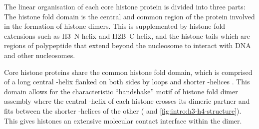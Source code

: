       The linear organisation of each core histone protein is divided
      into three parts: The histone fold domain is the central and
      common region of the protein
      involved in the formation of histone dimers.
      This is supplemented by histone fold extensions such as
      H3~\textalpha{}N helix and H2B~\textalpha{}C helix,
      and the histone tails which are regions of polypeptide
      that extend beyond the nucleosome to interact with DNA and
      other nucleosomes.

      Core histone proteins share the common
      histone fold domain, which is comprised of a long central
      \textalpha-helix flanked on both sides by loops
      and shorter \textalpha-helices \citep{arents1991-31angstrom, arents1995histone-fold}.
      This domain allows for the characteristic ``handshake'' motif
      of histone fold dimer assembly where the central \textalpha-helix of each
      histone crosses its dimeric partner and fits between the shorter
      \textalpha-helices of the other (
      and \ref{fig:intro:h3-h4-structure}).
      This gives histones an extensive molecular contact interface
      within the dimer.

